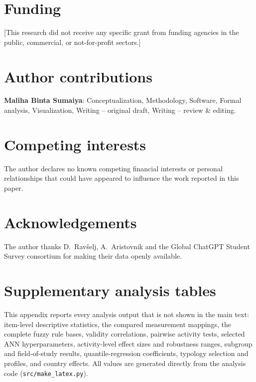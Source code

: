\documentclass[fleqn,10pt]{wlscirep}
\theoremstyle{remark}
\begin{document}
\section*{Funding}
[This research did not receive any specific grant from funding agencies in the public, commercial, or not-for-profit sectors.]

\section*{Author contributions}
\textbf{Maliha Binta Sumaiya}: Conceptualization, Methodology, Software, Formal analysis, Visualization, Writing -- original draft, Writing -- review \& editing.

\section*{Competing interests}
The author declares no known competing financial interests or personal relationships that could have appeared to influence the work reported in this paper.

\section*{Acknowledgements}
The author thanks D.~Rav\v{s}elj, A.~Aristovnik and the Global ChatGPT Student Survey consortium for making their data openly available.


\appendix
\section{Supplementary analysis tables}
\label{app:tables}
This appendix reports every analysis output that is not shown in the main text: item-level descriptive statistics, the compared measurement mappings, the complete fuzzy rule bases, validity correlations, pairwise activity tests, selected ANN hyperparameters, activity-level effect sizes and robustness ranges, subgroup and field-of-study results, quantile-regression coefficients, typology selection and profiles, and country effects. All values are generated directly from the analysis code (\texttt{src/make\_latex.py}).




\end{document}
